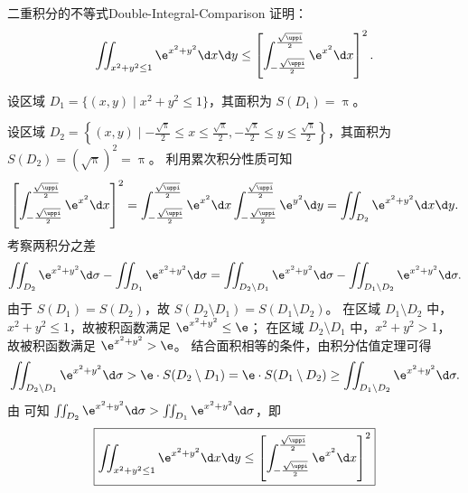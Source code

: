 \begin{problem}{二重积分的不等式}{Double-Integral-Comparison}
    证明：
    \begin{equation}
        \iint_{x^2+y^2 \le 1} \e^{x^2+y^2} \d x \d y \le \left[ \int_{-\frac{\sqrt{\uppi}}{2}}^{\frac{\sqrt{\uppi}}{2}} \e^{x^2} \d x \right]^2.
    \end{equation}
\end{problem}

\begin{myproof}

    设区域 $D_1 = \{ (x, y) \mid x^2 + y^2 \le 1 \}$，其面积为 $S(D_1) = \uppi$。

    设区域 $D_2 =  \left\{ (x, y)  \mid  -\frac{\sqrt{\uppi}}{2}  \le  x  \le  \frac{\sqrt{\uppi}}{2},  -\frac{\sqrt{\uppi}}{2}  \le  y  \le  \frac{\sqrt{\uppi}}{2}  \right\}$，其面积为 $S(D_2) = (\sqrt{\uppi})^2 = \uppi$。
    利用累次积分性质可知
    \begin{equation}
        \left[ \int_{-\frac{\sqrt{\uppi}}{2}}^{\frac{\sqrt{\uppi}}{2}} \e^{x^2} \d x \right]^2 = \int_{-\frac{\sqrt{\uppi}}{2}}^{\frac{\sqrt{\uppi}}{2}} \e^{x^2} \d x \int_{-\frac{\sqrt{\uppi}}{2}}^{\frac{\sqrt{\uppi}}{2}} \e^{y^2} \d y = \iint_{D_2} \e^{x^2+y^2} \d x \d y.
    \end{equation}
    考察两积分之差
    \begin{equation}
        \label{eq:diff-integral-01}
        \iint_{D_2} \e^{x^2+y^2} \d \sigma - \iint_{D_1} \e^{x^2+y^2} \d \sigma = \iint_{D_2 \setminus D_1} \e^{x^2+y^2} \d \sigma - \iint_{D_1 \setminus D_2} \e^{x^2+y^2} \d \sigma.
    \end{equation}
    由于 $S(D_1) = S(D_2)$，故 $S(D_2 \setminus D_1) = S(D_1 \setminus D_2)$。
    在区域 $D_1 \setminus D_2$ 中，$x^2 + y^2 \le 1$，故被积函数满足 $\e^{x^2+y^2} \le \e$；
    在区域 $D_2 \setminus D_1$ 中，$x^2 + y^2 > 1$，故被积函数满足 $\e^{x^2+y^2} > \e$。
    结合面积相等的条件，由积分估值定理可得
    \begin{equation}
        \iint_{D_2 \setminus D_1} \e^{x^2+y^2} \d \sigma > \e \cdot S(D_2 \setminus D_1) = \e \cdot S(D_1 \setminus D_2) \ge \iint_{D_1 \setminus D_2} \e^{x^2+y^2} \d \sigma.
    \end{equation}
    由  可知 $\iint_{D_2} \e^{x^2+y^2} \d \sigma > \iint_{D_1} \e^{x^2+y^2} \d \sigma$，即
    \begin{equation}
        \boxed{\iint_{x^2+y^2 \le 1} \e^{x^2+y^2} \d x \d y \le \left[ \int_{-\frac{\sqrt{\uppi}}{2}}^{\frac{\sqrt{\uppi}}{2}} \e^{x^2} \d x \right]^2}
    \end{equation}
\end{myproof}

